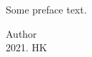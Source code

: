 \begin{preface}

Some preface text.

\begin{flushright}
Author\\
2021. HK
\end{flushright}

\end{preface}

